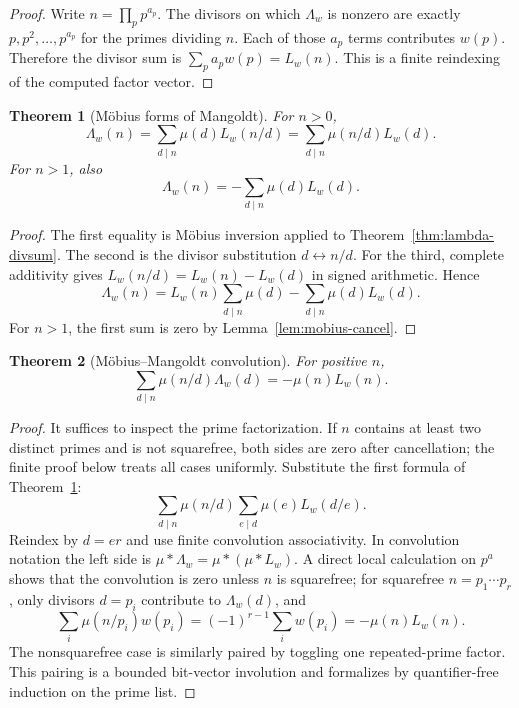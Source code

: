 \documentclass[11pt]{article}
\newtheorem{theorem}{Theorem}[section]
\theoremstyle{definition}
\begin{document}
\begin{proof}
Write \(n=\prod_pp^{a_p}\).  The divisors on which \(\Lambda_w\) is nonzero
are exactly \(p,p^2,\ldots,p^{a_p}\) for the primes dividing \(n\).  Each of
those \(a_p\) terms contributes \(w(p)\).  Therefore the divisor sum is
\(\sum_p a_pw(p)=L_w(n)\).  This is a finite reindexing of the computed factor
vector.
\end{proof}

\begin{theorem}[M\"obius forms of Mangoldt]\label{thm:lambda-mobius}
For \(n>0\),
\[
 \boxed{\displaystyle
 \Lambda_w(n)=\sum_{d\mid n}\mu(d)L_w(n/d)
 =\sum_{d\mid n}\mu(n/d)L_w(d).}
\]
For \(n>1\), also
\[
 \boxed{\displaystyle
 \Lambda_w(n)=-\sum_{d\mid n}\mu(d)L_w(d).}
\]
\end{theorem}

\begin{proof}
The first equality is M\"obius inversion applied to
Theorem~\ref{thm:lambda-divsum}.  The second is the divisor substitution
\(d\leftrightarrow n/d\).  For the third, complete additivity gives
\(L_w(n/d)=L_w(n)-L_w(d)\) in signed arithmetic.  Hence
\[
 \Lambda_w(n)
 =L_w(n)\sum_{d\mid n}\mu(d)-\sum_{d\mid n}\mu(d)L_w(d).
\]
For \(n>1\), the first sum is zero by Lemma~\ref{lem:mobius-cancel}.
\end{proof}

\begin{theorem}[M\"obius--Mangoldt convolution]\label{thm:mu-lambda}
For positive \(n\),
\[
 \boxed{\displaystyle
 \sum_{d\mid n}\mu(n/d)\Lambda_w(d)=-\mu(n)L_w(n).}
\]
\end{theorem}

\begin{proof}
It suffices to inspect the prime factorization.
If \(n\) contains at least two distinct primes and is not squarefree, both
sides are zero after cancellation; the finite proof below treats all cases
uniformly.  Substitute the first formula of
Theorem~\ref{thm:lambda-mobius}:
\[
 \sum_{d\mid n}\mu(n/d)\sum_{e\mid d}\mu(e)L_w(d/e).
\]
Reindex by \(d=er\) and use finite convolution associativity.  In convolution
notation the left side is \(\mu*\Lambda_w=\mu*(\mu*L_w)\).  A direct local
calculation on \(p^a\) shows that the convolution is zero unless \(n\) is
squarefree; for squarefree \(n=p_1\cdots p_r\), only divisors \(d=p_i\)
contribute to \(\Lambda_w(d)\), and
\[
 \sum_i\mu(n/p_i)w(p_i)=(-1)^{r-1}\sum_iw(p_i)
 =-\mu(n)L_w(n).
\]
The nonsquarefree case is similarly paired by toggling one repeated-prime
factor.  This pairing is a bounded bit-vector involution and formalizes by
quantifier-free induction on the prime list.
\end{proof}
\end{document}
